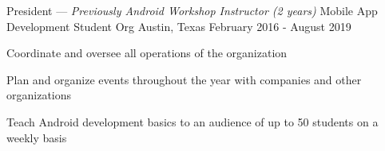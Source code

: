 


\begin{cventries}


\cventry
{President --- \emph{Previously Android Workshop Instructor (2 years)}} %
{Mobile App Development Student Org} %
{Austin, Texas} %
{February 2016 - August 2019} %
{ %
\begin{cvitems}
\item {Coordinate and oversee all operations of the organization}
\item {Plan and organize events throughout the year with companies and other organizations}
\item {Teach Android development basics to an audience of up to 50 students on a weekly basis}
\end{cvitems}
}


\end{cventries}